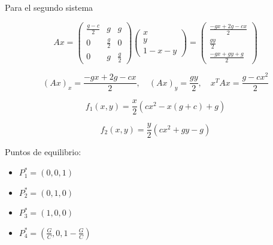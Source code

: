 \documentclass[twocolumn,aps,prl]{revtex4-1}
\begin{document}
Para el segundo sistema

$$
Ax =
\begin{pmatrix}
    \frac{g-c}{2}&g&g\\ 
    0&\frac{g}{2}&0\\ 
    0&g&\frac{g}{2}
\end{pmatrix}
\begin{pmatrix}
    x\\
    y\\ 
    1-x-y
\end{pmatrix}
=
\begin{pmatrix}
    \frac{-gx+2g-cx}{2}\\ 
    \frac{gy}{2}\\ 
    \frac{-gx+gy+g}{2}
\end{pmatrix}
$$


$$
(Ax)_x = \frac{-gx+2g-cx}{2}
, \quad 
(Ax)_y = \frac{gy}{2}
, \quad 
x^T Ax = \frac{g-cx^2}{2}
$$

$$
f_1(x, y) 
= 
\frac{x}{2} (
    cx^2
    -x(g+c)
    +g
    )
$$

$$
f_2(x, y) 
=
\frac{y}{2} (cx^2+gy-g)
$$


Puntos de equilibrio:

\begin{itemize}
    \item[] $P_1^* = (0, 0, 1 )$
    \item[] $P_2^* = (0, 1, 0)$
    \item[] $P_3^* = (1, 0, 0)$
    \item[] $P_4^* = (\frac{G}{C}, 0, 1- \frac{G}{C})$
\end{itemize}

\end{document}
